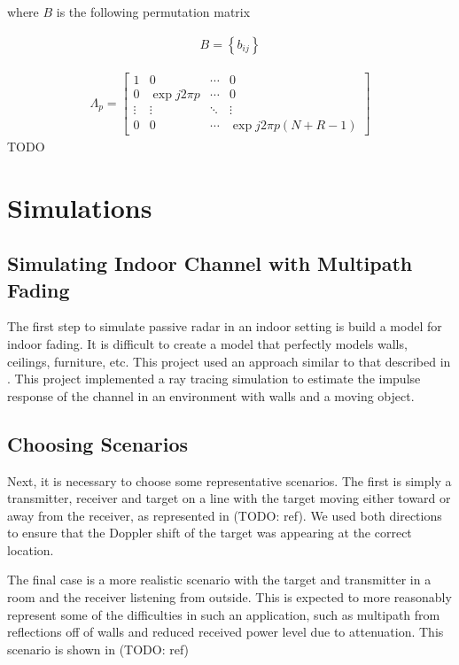 \documentclass[article,11pt,onecolumn,final]{IEEEtran}
\begin{document}
where $B$ is the following permutation matrix

\begin{align*}
B = \left \{b_{ij} \right \} 
\end{align*}

\begin{align*}
\Lambda_p = 
	\begin{bmatrix}
	 1			&		0				&		\cdots		&		0 \\
	 0			&		\exp{j2\pi p}	&		\cdots		&		0 \\
	 \vdots 	&		\vdots			&		\ddots		&		\vdots \\
	 0			&		0				&		\cdots		&		\exp{j2\pi p(N + R - 1)}
	\end{bmatrix}
\end{align*}
TODO

\section{Simulations}
\subsection{Simulating Indoor Channel with Multipath Fading}
The first step to simulate passive radar in an indoor setting is build a model for indoor fading. It is difficult to create a model that perfectly models walls, ceilings, furniture, etc. This project used an approach similar to that described in \cite{Holt}. This project implemented a ray tracing simulation to estimate the impulse response of the channel in an environment with walls and a moving object. 

\subsection{Choosing Scenarios}
Next, it is necessary to choose some representative scenarios. The first is simply a transmitter, receiver and target on a line with the target moving either toward or away from the receiver, as represented in (TODO: ref). We used both directions to ensure that the Doppler shift of the target was appearing at the correct location.

The final case is a more realistic scenario with the target and transmitter in a room and the receiver listening from outside. This is expected to more reasonably represent some of the difficulties in such an application, such as multipath from reflections off of walls and reduced received power level due to attenuation. This scenario is shown in (TODO: ref)
\end{document}

